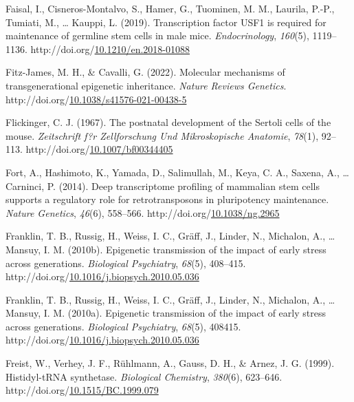 \documentclass[12pt,twoside]{reedthesis}
\newlength{\cslhangindent}
\newenvironment{CSLReferences}[2] %
 {%
  \setlength{\parindent}{0pt}
  \ifodd #1 \everypar{\setlength{\hangindent}{\cslhangindent}}\ignorespaces\fi
  \ifnum #2 > 0
  \setlength{\parskip}{#2\baselineskip}
  \fi
 }%
 {}
\begin{document}
\begin{CSLReferences}{1}{0}
\leavevmode{}%
Faisal, I., Cisneros-Montalvo, S., Hamer, G., Tuominen, M. M., Laurila, P.-P., Tumiati, M., \ldots{} Kauppi, L. (2019). Transcription factor USF1 is required for maintenance of germline stem cells in male mice. \emph{Endocrinology}, \emph{160}(5), 1119--1136. http://doi.org/\href{https://doi.org/10.1210/en.2018-01088}{10.1210/en.2018-01088}

\leavevmode{}%
Fitz-James, M. H., \& Cavalli, G. (2022). Molecular mechanisms of transgenerational epigenetic inheritance. \emph{Nature Reviews Genetics}. http://doi.org/\href{https://doi.org/10.1038/s41576-021-00438-5}{10.1038/s41576-021-00438-5}

\leavevmode{}%
Flickinger, C. J. (1967). The postnatal development of the Sertoli cells of the mouse. \emph{Zeitschrift f?r Zellforschung Und Mikroskopische Anatomie}, \emph{78}(1), 92--113. http://doi.org/\href{https://doi.org/10.1007/bf00344405}{10.1007/bf00344405}

\leavevmode{}%
Fort, A., Hashimoto, K., Yamada, D., Salimullah, M., Keya, C. A., Saxena, A., \ldots{} Carninci, P. (2014). Deep transcriptome profiling of mammalian stem cells supports a regulatory role for retrotransposons in pluripotency maintenance. \emph{Nature Genetics}, \emph{46}(6), 558--566. http://doi.org/\href{https://doi.org/10.1038/ng.2965}{10.1038/ng.2965}

\leavevmode{}%
Franklin, T. B., Russig, H., Weiss, I. C., Gräff, J., Linder, N., Michalon, A., \ldots{} Mansuy, I. M. (2010b). Epigenetic transmission of the impact of early stress across generations. \emph{Biological Psychiatry}, \emph{68}(5), 408--415. http://doi.org/\href{https://doi.org/10.1016/j.biopsych.2010.05.036}{10.1016/j.biopsych.2010.05.036}

\leavevmode{}%
Franklin, T. B., Russig, H., Weiss, I. C., Gräff, J., Linder, N., Michalon, A., \ldots{} Mansuy, I. M. (2010a). Epigenetic transmission of the impact of early stress across generations. \emph{Biological Psychiatry}, \emph{68}(5), 408415. http://doi.org/\href{https://doi.org/10.1016/j.biopsych.2010.05.036}{10.1016/j.biopsych.2010.05.036}

\leavevmode{}%
Freist, W., Verhey, J. F., Rühlmann, A., Gauss, D. H., \& Arnez, J. G. (1999). Histidyl-tRNA synthetase. \emph{Biological Chemistry}, \emph{380}(6), 623--646. http://doi.org/\href{https://doi.org/10.1515/BC.1999.079}{10.1515/BC.1999.079}


\end{CSLReferences}
\end{document}
